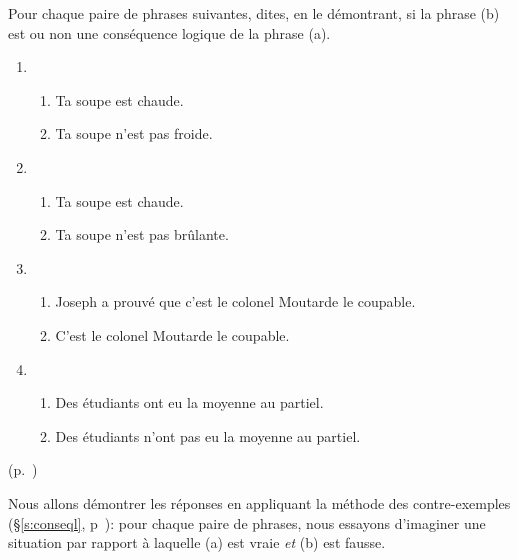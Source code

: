\begin{exo}\label{exo:1CL}
Pour chaque paire de phrases suivantes,
dites, en le démontrant, si la phrase (b) est ou non une conséquence logique de la phrase (a).
\begin{enumerate}
\item 
  \begin{enumerate}
  \item Ta soupe est chaude.
  \item Ta soupe n'est pas froide.
  \end{enumerate}
\item 
  \begin{enumerate}
  \item Ta soupe est chaude.
  \item Ta soupe n'est pas brûlante.
  \end{enumerate}
\item 
  \begin{enumerate}
  \item Joseph a prouvé que c'est le colonel Moutarde le coupable.
  \item C'est le colonel Moutarde le coupable.
  \end{enumerate}
\item 
  \begin{enumerate}
  \item Des étudiants ont eu la moyenne au partiel. 
  \item Des étudiants n'ont pas eu la moyenne au partiel. 
  \end{enumerate}
\end{enumerate}
\begin{solu}(p.~\pageref{exo:1CL})\label{crg:1CL}

\sloppy

Nous allons démontrer les réponses en appliquant la méthode des contre-exemples (\S\ref{s:conseql}, p~\pageref{p.contrex}):  pour chaque paire de phrases, nous essayons d'imaginer une situation par rapport à laquelle (a) est vraie \emph{et} (b) est fausse.


\end{solu}
\end{exo}
